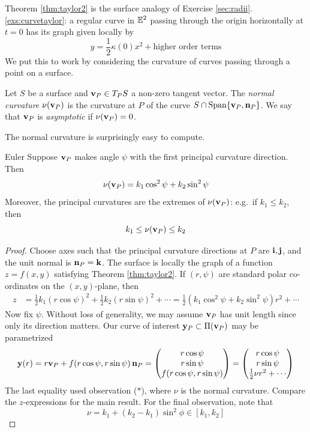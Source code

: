 
Theorem \ref{thm:taylor2} is the surface analogy of Exercise \ref*{sec:radii}.\ref{exs:curvetaylor}: a regular curve in $\mathbb{E}^2$ passing through the origin horizontally at $t=0$ has its graph given locally by
\[
	y=\frac 12\kappa(0)x^2+\text{higher order terms} \tag{$\ast$}
	\]
We put this to work by considering the curvature of curves passing through a point on a surface.

\begin{defn}{}{}
	Let $S$ be a surface and ${\mathbf{v}}_P\in T_PS$ a non-zero tangent vector.\smallbreak
	The \emph{normal curvature} $\nu({\mathbf{v}}_P)$ is the curvature at $P$ of the curve\footnotemark{} $S\cap\operatorname{Span}\{{\mathbf{v}}_P,{\mathbf{n}}_P\}$.\smallbreak
	We say that ${\mathbf{v}}_P$ is \emph{asymptotic} if $\nu({\mathbf{v}}_P)=0$.
\end{defn}


\goodbreak


The normal curvature is surprisingly easy to compute.

\begin{thm}{Euler}{}
	Suppose ${\mathbf{v}}_P$ makes angle $\psi$ with the first principal curvature direction. Then %
	\[
		\nu({\mathbf{v}}_P)=k_1\cos^2\psi +k_2\sin^2\psi
	\]
	Moreover, the principal curvatures are the extremes of $\nu({\mathbf{v}}_P)$: e.g.\ if $k_1\le k_2$, then
	\[
		k_1\le\nu({\mathbf{v}}_P)\le k_2
	\]
\end{thm}

\begin{proof}
	Choose axes such that the principal curvature directions at $P$ are ${\mathbf{i}},{\mathbf{j}}$, and the unit normal is ${\mathbf{n}}_P={\mathbf{k}}$. The surface is locally the graph of a function $z=f(x,y)$ satisfying Theorem \ref{thm:taylor2}. If $(r,\psi)$ are standard polar co-ordinates on the $(x,y)$-plane, then 
	\begin{align*}
		z&=\tfrac{1}{2}k_1(r\cos\psi)^2+\tfrac{1}{2}k_2(r\sin\psi)^2+\cdots= \frac 12(k_1\cos^2\psi+k_2\sin^2\psi)r^2+\cdots
	\end{align*}
	Now fix $\psi$. Without loss of generality, we may assume ${\mathbf{v}}_P$ has unit length since only its direction matters. Our curve of interest ${\mathbf{y}}_P\subset\Pi({\mathbf{v}}_P)$ may be parametrized
	\[
		{\mathbf{y}}(r)= r{\mathbf{v}}_P+f(r\cos\psi,r\sin\psi)\,{\mathbf{n}}_P= \begin{pmatrix}r\cos\psi\\r\sin\psi\\f(r\cos\psi,r\sin\psi)\end{pmatrix} =\begin{pmatrix}r\cos\psi\\r\sin\psi\\\frac 12\nu r^2+\cdots\end{pmatrix}
	\]
	The last equality used observation ($\ast$), where $\nu$ is the normal curvature. Compare the $z$-expressions for the main result. For the final observation, note that
	\[
		\nu=k_1+(k_2-k_1)\sin^2\phi\in[k_1,k_2] \tag*{\qedhere}
	\]
\end{proof}


